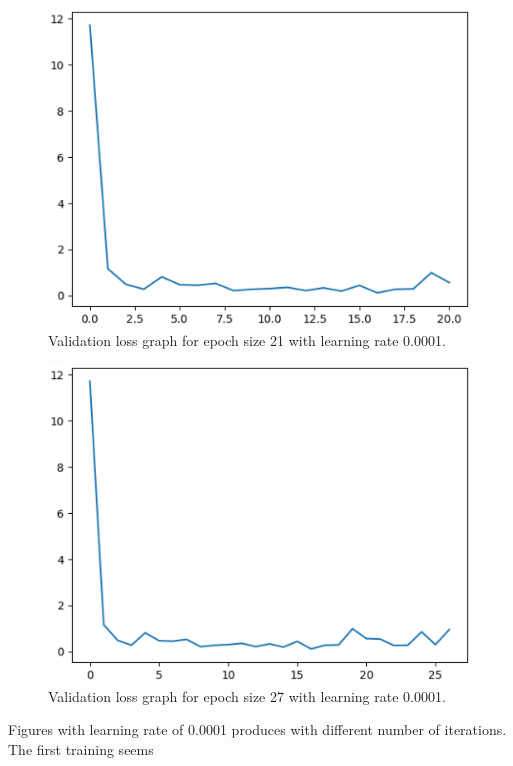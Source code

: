     \begin{figure}
        \includegraphics[width=\textwidth, scale=0.25]{4_30000.eps}
        \caption{Validation loss graph for epoch size 21 with learning rate 0.0001.} \label{Figure2}
    \end{figure}

    \begin{figure}
        \includegraphics[width=\textwidth, scale=0.25]{4_40000.eps}
        \caption{Validation loss graph for epoch size 27 with learning rate 0.0001.} \label{Figure3}
    \end{figure}

Figures with learning rate of 0.0001 produces  with different number of iterations.
The first training seems

